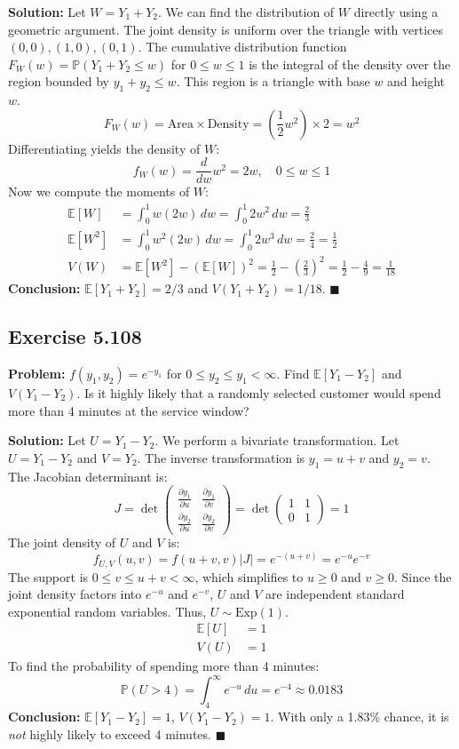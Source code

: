 \documentclass[11pt, a4paper]{article}
\theoremstyle{definition}
\theoremstyle{remark}
\newcommand{\E}{\mathbb{E}}
\newcommand{\Prob}{\mathbb{P}}
\begin{document}
\textbf{Solution:}
Let $W = Y_1 + Y_2$. We can find the distribution of $W$ directly using a geometric argument. The joint density is uniform over the triangle with vertices $(0,0), (1,0), (0,1)$.
The cumulative distribution function $F_W(w) = \Prob(Y_1 + Y_2 \le w)$ for $0 \le w \le 1$ is the integral of the density over the region bounded by $y_1+y_2 \le w$. This region is a triangle with base $w$ and height $w$.
\[ F_W(w) = \text{Area} \times \text{Density} = \left(\frac{1}{2} w^2\right) \times 2 = w^2 \]
Differentiating yields the density of $W$:
\[ f_W(w) = \frac{d}{dw} w^2 = 2w, \quad 0 \le w \le 1 \]
Now we compute the moments of $W$:
\begin{align*}
\E[W] &= \int_0^1 w(2w) \, dw = \int_0^1 2w^2 \, dw = \frac{2}{3} \\
\E[W^2] &= \int_0^1 w^2(2w) \, dw = \int_0^1 2w^3 \, dw = \frac{2}{4} = \frac{1}{2} \\
V(W) &= \E[W^2] - (\E[W])^2 = \frac{1}{2} - \left(\frac{2}{3}\right)^2 = \frac{1}{2} - \frac{4}{9} = \frac{1}{18}
\end{align*}
\textbf{Conclusion:} $\E[Y_1+Y_2] = 2/3$ and $V(Y_1+Y_2) = 1/18$. $\blacksquare$

\subsection{Exercise 5.108}
\textbf{Problem:} $f(y_1, y_2) = e^{-y_1}$ for $0 \le y_2 \le y_1 < \infty$. Find $\E[Y_1 - Y_2]$ and $V(Y_1 - Y_2)$. Is it highly likely that a randomly selected customer would spend more than 4 minutes at the service window?

\textbf{Solution:}
Let $U = Y_1 - Y_2$. We perform a bivariate transformation. Let $U = Y_1 - Y_2$ and $V = Y_2$.
The inverse transformation is $y_1 = u + v$ and $y_2 = v$. The Jacobian determinant is:
\[ J = \det \begin{pmatrix} \frac{\partial y_1}{\partial u} & \frac{\partial y_1}{\partial v} \\ \frac{\partial y_2}{\partial u} & \frac{\partial y_2}{\partial v} \end{pmatrix} = \det \begin{pmatrix} 1 & 1 \\ 0 & 1 \end{pmatrix} = 1 \]
The joint density of $U$ and $V$ is:
\[ f_{U,V}(u, v) = f(u+v, v) |J| = e^{-(u+v)} = e^{-u} e^{-v} \]
The support is $0 \le v \le u+v < \infty$, which simplifies to $u \ge 0$ and $v \ge 0$.
Since the joint density factors into $e^{-u}$ and $e^{-v}$, $U$ and $V$ are independent standard exponential random variables.
Thus, $U \sim \text{Exp}(1)$.
\begin{align*}
\E[U] &= 1 \\
V(U) &= 1
\end{align*}
To find the probability of spending more than 4 minutes:
\[ \Prob(U > 4) = \int_4^\infty e^{-u} \, du = e^{-4} \approx 0.0183 \]
\textbf{Conclusion:} $\E[Y_1-Y_2] = 1$, $V(Y_1-Y_2) = 1$. With only a 1.83\% chance, it is \textit{not} highly likely to exceed 4 minutes. $\blacksquare$
\end{document}
